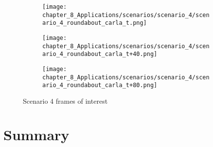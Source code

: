 \begin{figure}[t!]
	\begin{subfigure}{0.48\textwidth}
		\texttt{[image: chapter\_8\_Applications/scenarios/scenario\_4/scenario\_4\_roundabout\_carla\_t.png]}
		\caption{}
		\label{subfig:chapter_8_Applications/scenarios/scenario_4/scenario_4_roundabout_carla_t.png}
	\end{subfigure}
	\hfill 
	\begin{subfigure}{0.48\textwidth}
		\caption{}
		\label{subfig:chapter_8_Applications/scenarios/scenario_4/scenario_4_roundabout_rviz_t}
	\end{subfigure}
	\begin{subfigure}{0.48\textwidth}
		\texttt{[image: chapter\_8\_Applications/scenarios/scenario\_4/scenario\_4\_roundabout\_carla\_t+40.png]}
		\caption{}
		\label{subfig:chapter_8_Applications/scenarios/scenario_4/scenario_4_roundabout_carla_t+40.png}
	\end{subfigure}
	\hfill 
	\begin{subfigure}{0.48\textwidth}
		\caption{}
		\label{subfig:chapter_8_Applications/scenarios/scenario_4/scenario_4_roundabout_rviz_t+40}
	\end{subfigure}
	\begin{subfigure}{0.48\textwidth}
		\texttt{[image: chapter\_8\_Applications/scenarios/scenario\_4/scenario\_4\_roundabout\_carla\_t+80.png]}
		\caption{}
		\label{subfig:chapter_8_Applications/scenarios/scenario_4/scenario_4_roundabout_carla_t+80}
	\end{subfigure}
	\begin{subfigure}{0.48\textwidth}
		\caption{}
		\label{subfig:chapter_8_Applications/scenarios/scenario_4/scenario_4_roundabout_rviz_t+80}
	\end{subfigure}
	\caption{Scenario 4 frames of interest}
	\label{fig:chapter_8_Applications/scenarios/scenario_4_frames_of_interest}
\end{figure}

\section{Summary}
\label{sec:8_summary}

